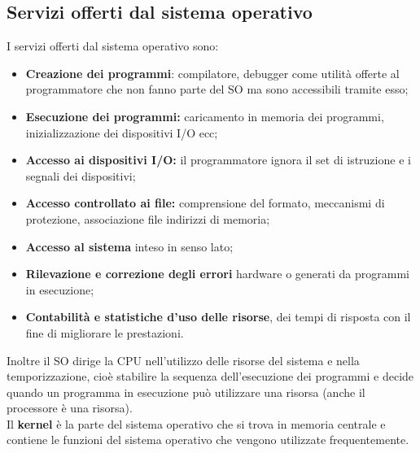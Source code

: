 \documentclass[12pt, letterpaper]{report}
\begin{document}
	\subsection{Servizi offerti dal sistema operativo}
	I servizi offerti dal sistema operativo sono:
	\begin{itemize}
		\item \textbf{Creazione dei programmi}: compilatore, debugger come utilità offerte al programmatore che non fanno parte del SO ma sono accessibili tramite esso;
		\item \textbf{Esecuzione dei programmi:} caricamento in memoria dei programmi, inizializzazione dei dispositivi I/O ecc;
		\item \textbf{Accesso ai dispositivi I/O:} il programmatore ignora il set di istruzione e i segnali dei dispositivi;
		\item \textbf{Accesso controllato ai file:} comprensione del formato, meccanismi di protezione, associazione file indirizzi di memoria;
		\item \textbf{Accesso al sistema} inteso in senso lato;
		\item \textbf{Rilevazione e correzione degli errori} hardware o generati da programmi in esecuzione;
		\item \textbf{Contabilità e statistiche d'uso delle risorse}, dei tempi di risposta con il fine di migliorare le prestazioni.
	\end{itemize}
	Inoltre il SO dirige la CPU nell'utilizzo delle risorse del sistema e nella temporizzazione, cioè stabilire la sequenza dell'esecuzione dei programmi e decide quando un programma in esecuzione può utilizzare una risorsa (anche il processore è una risorsa). \\
	Il \textbf{kernel} è la parte del sistema operativo che si trova in memoria centrale e contiene le funzioni del sistema operativo che vengono utilizzate frequentemente.
\end{document}
